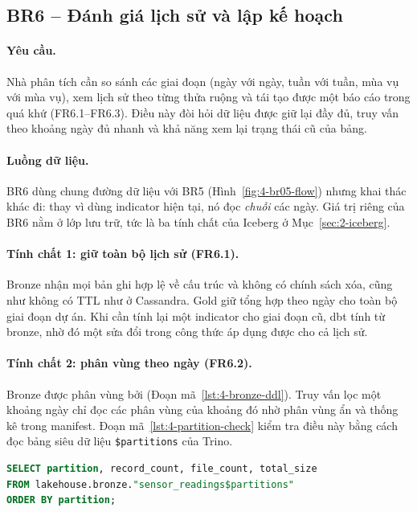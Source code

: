 \subsection{BR6 -- Đánh giá lịch sử và lập kế hoạch}
\label{sec:4-br06}

\paragraph{Yêu cầu.} Nhà phân tích cần so sánh các giai đoạn (ngày với ngày, tuần với tuần, mùa vụ với mùa vụ), xem lịch sử theo từng thửa ruộng và tái tạo được một báo cáo trong quá khứ (FR6.1--FR6.3). Điều này đòi hỏi dữ liệu được giữ lại đầy đủ, truy vấn theo khoảng ngày đủ nhanh và khả năng xem lại trạng thái cũ của bảng.

\paragraph{Luồng dữ liệu.} BR6 dùng chung đường dữ liệu với BR5 (Hình~\ref{fig:4-br05-flow}) nhưng khai thác khác đi: thay vì dùng indicator hiện tại, nó đọc \emph{chuỗi} các ngày. Giá trị riêng của BR6 nằm ở lớp lưu trữ, tức là ba tính chất của Iceberg ở Mục~\ref{sec:2-iceberg}.

\paragraph{Tính chất 1: giữ toàn bộ lịch sử (FR6.1).} Bronze nhận mọi bản ghi hợp lệ về cấu trúc và không có chính sách xóa, cũng như không có TTL như ở Cassandra. Gold giữ tổng hợp theo ngày cho toàn bộ giai đoạn dự án. Khi cần tính lại một indicator cho giai đoạn cũ, dbt tính từ bronze, nhờ đó một sửa đổi trong công thức áp dụng được cho cả lịch sử.

\paragraph{Tính chất 2: phân vùng theo ngày (FR6.2).} Bronze được phân vùng bởi  (Đoạn mã~\ref{lst:4-bronze-ddl}). Truy vấn lọc một khoảng ngày chỉ đọc các phân vùng của khoảng đó nhờ phân vùng ẩn và thống kê trong manifest. Đoạn mã~\ref{lst:4-partition-check} kiểm tra điều này bằng cách đọc bảng siêu dữ liệu \texttt{\$partitions} của Trino.

\begin{lstlisting}[language=SQL, caption={Kiểm tra phân vùng và tệp của bảng bronze (Trino)}, label={lst:4-partition-check}]
SELECT partition, record_count, file_count, total_size
FROM lakehouse.bronze."sensor_readings$partitions"
ORDER BY partition;
\end{lstlisting}

